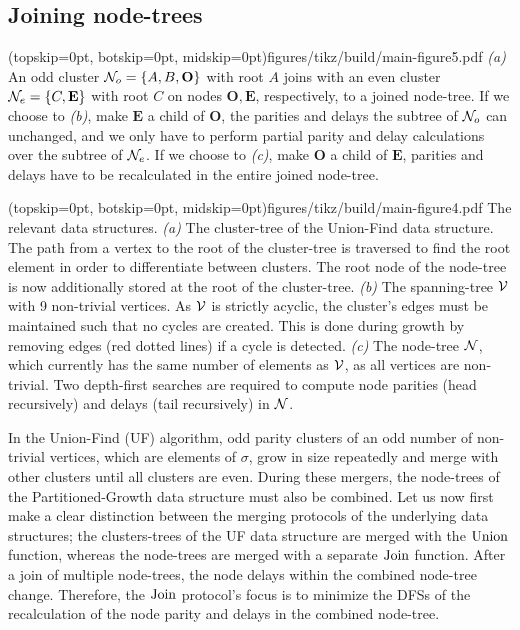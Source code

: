 \subsection{Joining node-trees}\label{sec:nodejoin}

\Figure[b](topskip=0pt, botskip=0pt, midskip=0pt){figures/tikz/build/main-figure5.pdf}{
    \emph{(a)} An odd cluster $\mathcal{N}_o=\{A, B, \mathbf{O}\}$ with root $A$ joins with an even cluster $\mathcal{N}_e=\{C, \mathbf{E}\}$ with root $C$ on nodes $\mathbf{O}, \mathbf{E}$, respectively, to a joined node-tree. If we choose to \emph{(b)}, make $\mathbf{E}$ a child of $\mathbf{O}$, the parities and delays the subtree of $\mathcal{N}_o$ can unchanged, and we only have to perform partial parity and delay calculations over the subtree of $\mathcal{N}_e$. If we choose to \emph{(c)}, make $\mathbf{O}$ a child of $\mathbf{E}$, parities and delays have to be recalculated in the entire joined node-tree. \label{fig:inversion}}

\Figure[tb](topskip=0pt, botskip=0pt, midskip=0pt){figures/tikz/build/main-figure4.pdf}{
    The relevant data structures. \emph{(a)} The cluster-tree of the Union-Find data structure. The path from a vertex to the root of the cluster-tree is traversed to find the root element in order to differentiate between clusters. The root node of the node-tree is now additionally stored at the root of the cluster-tree. \emph{(b)} The spanning-tree $\mathcal{V}$ with 9 non-trivial vertices. As $\mathcal{V}$ is strictly acyclic, the cluster's edges must be maintained such that no cycles are created. This is done during growth by removing edges (red dotted lines) if a cycle is detected. \emph{(c)} The node-tree $\mathcal{N}$, which currently has the same number of elements as $\mathcal{V}$, as all vertices are non-trivial. Two depth-first searches are required to compute node parities (head recursively) and delays (tail recursively) in $\mathcal{N}$.\label{fig:nodetypes}}


In the Union-Find (UF) algorithm, odd parity clusters of an odd number of non-trivial vertices, which are elements of $\sigma$, grow in size repeatedly and merge with other clusters until all clusters are even. During these mergers, the node-trees of the Partitioned-Growth data structure must also be combined. Let us now first make a clear distinction between the merging protocols of the underlying data structures; the clusters-trees of the UF data structure are merged with the $\operatorname{Union}$ function, whereas the node-trees are merged with a separate $\operatorname{Join}$ function. After a join of multiple node-trees, the node delays within the combined node-tree change. Therefore, the $\operatorname{Join}$ protocol's focus is to minimize the DFSs of the recalculation of the node parity and delays in the combined node-tree. 

